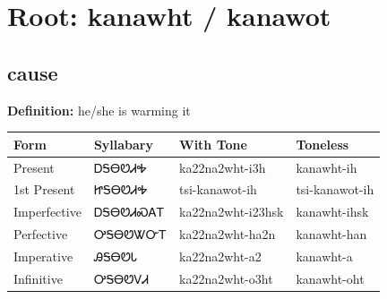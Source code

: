 \documentclass{article}%
\begin{document}
%
\normalsize%
\section*{Root: kanawht / kanawot}%
\subsection*{cause}%
\textbf{Definition: }%
he/she is warming it%
\\[0.5em]%
\begin{tabular}{|l|l|l|l|}%
\hline%
\textbf{Form}&\textbf{Syllabary}&\textbf{With Tone}&\textbf{Toneless}\\%
\hline%
Present&ᎠᎦᎾᏬᏗᎭ&ka22na2wht{-}i3h&kanawht{-}ih\\%
1st Present&ᏥᎦᎾᏬᏗᎭ&tsi{-}kanawot{-}ih&tsi{-}kanawot{-}ih\\%
Imperfective&ᎠᎦᎾᏬᏗᏍᎪᎢ&ka22na2wht{-}i23hsk&kanawht{-}ihsk\\%
Perfective&ᎤᎦᎾᏬᏔᏅᎢ&ka22na2wht{-}ha2n&kanawht{-}han\\%
Imperative&ᎯᎦᎾᏬᏓ&ka22na2wht{-}a2&kanawht{-}a\\%
Infinitive&ᎤᎦᎾᏬᏙᏗ&ka22na2wht{-}o3ht&kanawht{-}oht\\%
\hline%
\end{tabular}%
\\[1em]%
\end{document}
